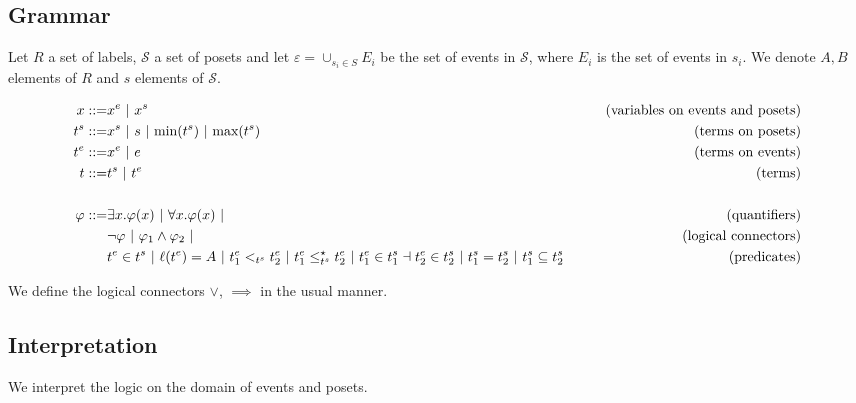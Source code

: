 
\subsection{Grammar}

Let $R$ a set of labels, $\mathcal{S}$ a set of posets and let $\varepsilon = \cup_{s_i\in S} E_i$ be the set of events in $\mathcal{S}$, where $E_i$ is the set of events in $s_i$.
We denote $A,B$ elements of $R$ and $s$ elements of $\mathcal{S}$.

\begin{align*}
  x ::= & x^e ~|~ x^s & \tag{variables on events and posets} \\
  t^s ::= & x^s ~|~ s ~|~ \text{min}(t^s) ~|~ \text{max}(t^s) &\tag{terms on posets} \\
  t^e ::= & x^e ~|~ e & \tag{terms on events}\\
  t ::= & t^s ~|~ t^e & \tag{terms}\\
  \\
  \varphi ::= & \exists x.\varphi(x) ~|~ \forall x.\varphi(x) ~|&\tag{quantifiers}\\
  & \neg \varphi ~|~\varphi_1 \wedge \varphi_2~|&\tag{logical connectors}\\
  & t^e\in t^s ~|~ \ell(t^e) = A ~|~ t^e_1 <_{t^s} t^e_2 ~|~ t^e_1 \leq^{\star}_{t^s} t^e_2 ~|~ t^e_1\in t^s_1 \dashv t^e_2\in t^s_2~|~ t^s_1 = t^s_2 ~|~ t^s_1\subseteq t^s_2
  & \tag{predicates}\\
\end{align*}

We define the logical connectors $\vee$, $\implies$ in the usual manner.

\subsection{Interpretation}

We interpret the logic on the domain of events and posets.

